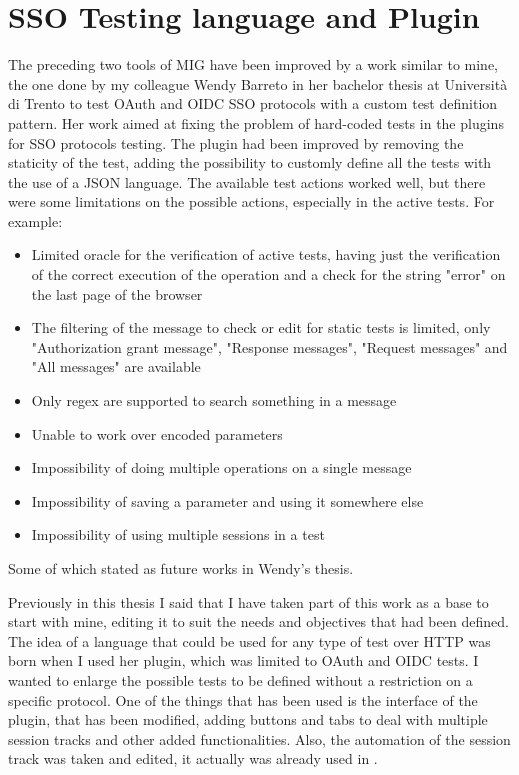 \section{SSO Testing language and Plugin}
The preceding two tools of MIG have been improved by a work similar to mine, the one done by my colleague Wendy Barreto \cite{wendy_barreto} in her bachelor thesis at Università di Trento to test \Gls{OAuth} and \Gls{OIDC} SSO protocols with a custom test definition pattern. Her work aimed at fixing the problem of hard-coded tests in the plugins for SSO protocols testing. The plugin had been improved by removing the staticity of the test, adding the possibility to customly define all the tests with the use of a JSON language.
The available test actions worked well, but there were some limitations on the possible actions, especially in the active tests. For example:
\begin{itemize}
    \item Limited oracle for the verification of active tests, having just the verification of the correct execution of the operation and a check for the string "error" on the last page of the browser
    \item The filtering of the message to check or edit for static tests is limited, only "Authorization grant message", "Response messages", "Request messages" and "All messages" are available
    \item Only regex are supported to search something in a message
    \item Unable to work over encoded parameters
    \item Impossibility of doing multiple operations on a single message
    \item Impossibility of saving a parameter and using it somewhere else
    \item Impossibility of using multiple sessions in a test
\end{itemize}
Some of which stated as future works in Wendy's thesis.

Previously in this thesis I said that I have taken part of this work as a base to start with mine, editing it to suit the needs and objectives that had been defined. The idea of a language that could be used for any type of test over HTTP was born when I used her plugin, which was limited to \Gls{OAuth} and \Gls{OIDC} tests. I wanted to enlarge the possible tests to be defined without a restriction on a specific protocol. 
One of the things that has been used is the interface of the plugin, that has been modified, adding buttons and tabs to deal with multiple \gls{session track}s and other added functionalities. Also, the automation of the \gls{session track} was taken and edited, it actually was already used in \cite{claudio_grisenti}\cite{stefano_facchini}.

